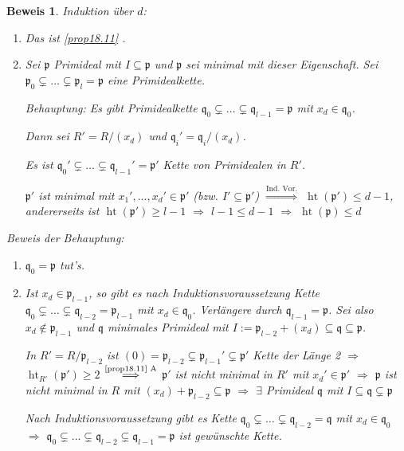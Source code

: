 \documentclass[a4paper, 12pt, numbers=noendperiod, chapterprefix=true]{scrbook}
\theoremstyle{break}
\theoremstyle{nonumberbreak}
\newtheorem{Bew}{Beweis}
\theoremstyle{nonumberplain}
\DeclareMathOperator{\Ht}{ht}
\newcommand{\frakp}{\mathfrak{p}}
\newcommand{\frakq}{\mathfrak{q}}
\begin{document}
\begin{Bew}
Induktion \"uber $d$:\begin{enumerate}[$d=10$]
\item[\underline{$d=1$:}]
	Das ist \ref{prop18.11} .
\item[\underline{$d\ge2$:}]
	Sei $\frakp$ Primideal mit $I\subseteq \frakp$ und $\frakp$ sei minimal mit dieser Eigenschaft. Sei $\frakp_0\subsetneq\ldots \subsetneq \frakp_l= \frakp$ eine Primidealkette.
	
	\emph{Behauptung:} Es gibt Primidealkette $\frakq_0\subsetneq\ldots \subsetneq\frakq_{l-1}=\frakp$ mit $x_d\in\frakq_0$.
	
	Dann sei $R'=R/(x_d)$ und $\frakq_i'=\frakq_i/(x_d)$.
	
	Es ist $\frakq_0'\subsetneq\ldots \subsetneq\frakq_{l-1}'=\frakp'$ Kette von Primidealen in $R'$.
	
	$\frakp'$ ist minimal mit $x_1',\ldots ,x_d'\in \frakp'$ (bzw. $I'\subseteq\frakp'$) $\overset{\text{Ind. Vor.}}{\Longrightarrow}$ $\Ht(\frakp')\le d-1$, andererseits ist $\Ht(\frakp')\ge l-1$ $\Rightarrow $ $l-1 \le d-1$ $\Rightarrow $ $\Ht(\frakp)\le d$
\end{enumerate}
\emph{Beweis der Behauptung:}\begin{enumerate}[$l=10$]
\item[\underline{$l=1$:}]
	$\frakq_0=\frakp$ tut's.
\item[\underline{$l\ge2$:}]
	Ist $x_d\in \frakp_{l-1}$, so gibt es nach Induktionsvoraussetzung Kette $\frakq_0\subsetneq\ldots \subsetneq\frakq_{l-2}=\frakp_{l-1}$ mit $x_d\in \frakq_0$. Verl\"angere durch $\frakq_{l-1}=\frakp$. Sei also $x_d\notin \frakp_{l-1}$ und $\frakq$ minimales Primideal mit $I:=\frakp_{l-2}+(x_d)\subseteq\frakq\subseteq\frakp$.
	
	In $R'=R/\frakp_{l-2}$ ist $(0) = \frakp_{l-2}\subsetneq\frakp_{l-1}'\subsetneq\frakp'$ Kette der L\"ange 2 $\Rightarrow$ $\Ht_{R'}(\frakp')\ge2$ $\overset{\text{\ref{prop18.11} A}}{\Longrightarrow}$ $\frakp'$ ist \emph{nicht} minimal in $R'$ mit $x_d'\in\frakp'$ $\Rightarrow $ $\frakp$ ist nicht minimal in $R$ mit $(x_d)+\frakp_{l-2}\subseteq\frakp$ $\Rightarrow $ $\exists$ Primideal $\frakq$ mit $I\subseteq\frakq\subsetneq\frakp$
	
	Nach Induktionsvoraussetzung gibt es Kette $\frakq_0\subsetneq\ldots \subsetneq\frakq_{l-2}=\frakq$ mit $x_d\in\frakq_0$ $\Rightarrow $ $\frakq_0\subsetneq\ldots \subsetneq\frakq_{l-2}\subsetneq\frakq_{l-1}=\frakp$ ist gew\"unschte Kette.
\end{enumerate}\end{Bew}
\end{document}
